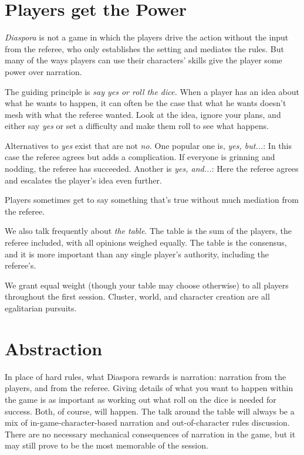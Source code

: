 \vfil
\section{Players get the Power}\label{sec:players-get-the-power}

\emph{Diaspora} is not a game in which the players drive the action without the input from the referee, who only establishes the setting and mediates the rules.  But many of the ways players can use their characters' skills give the player some power over narration.

The guiding principle is \emph{say yes or roll the dice.} When a player has an idea about what he wants to happen, it can often be the case that what he wants doesn't mesh with what the referee wanted. Look at the idea, ignore your plans, and either say \emph{yes} or set a difficulty and make them roll to see what happens.


Alternatives to \emph{yes} exist that are not \emph{no.} One popular one is, \emph{yes, but...}: In this case the referee agrees but adds a complication. If everyone is grinning and nodding, the referee has succeeded. Another is \emph{yes, and...}: Here the referee agrees and escalates the player's idea even further.

Players sometimes get to say something that's true without much mediation from the referee.

We also talk frequently about \emph{the table}. The table is the sum of the players, the referee included, with all opinions weighed equally. The table is the consensus, and it is more important than any single player's authority, including the referee's.


We grant equal weight (though your table may choose otherwise) to all players throughout the first session. Cluster, world, and character creation are all egalitarian pursuits.


\section{Abstraction}
\label{sec:abstraction}

% 

In place of hard rules, what Diaspora rewards is narration: narration from the players, and from the referee. Giving details of what you want to happen within the game is as important as working out what roll on the dice is needed for success. Both, of course, will happen. The talk around the table will always be a mix of in-game-character-based narration and out-of-character rules discussion. There are no necessary mechanical consequences of narration in the game, but it may still prove to be the most memorable of the session.

